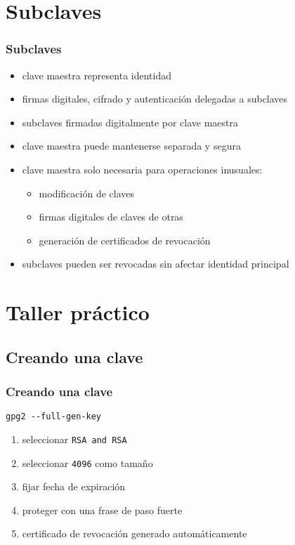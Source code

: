 \documentclass{beamer}
\let\olditem\item
\renewcommand{\item}{%
\olditem\vspace{3pt}}
\begin{document}
\section{Subclaves}
\begin{frame}
\frametitle{Subclaves}
\begin{itemize}
    \item clave maestra representa identidad
    \item firmas digitales, cifrado y autenticación delegadas a subclaves
    \item subclaves firmadas digitalmente por clave maestra
    \item clave maestra puede mantenerse separada y segura
    \item clave maestra solo necesaria para operaciones inusuales:
        \begin{itemize}
            \item modificación de claves
            \item firmas digitales de claves de otras
            \item generación de certificados de revocación
        \end{itemize}
    \item subclaves pueden ser revocadas sin afectar identidad principal
\end{itemize}
\end{frame}


\section{Taller práctico}


\subsection{Creando una clave}
\begin{frame}[fragile]
\frametitle{Creando una clave}
\begin{lstlisting}
gpg2 --full-gen-key
\end{lstlisting}
\begin{enumerate}
    \item seleccionar \texttt{RSA and RSA}
    \item seleccionar \texttt{4096} como tamaño
    \item fijar fecha de expiración
    \item proteger con una frase de paso fuerte
    \item certificado de revocación generado automáticamente
\end{enumerate}
\end{frame}
\end{document}
